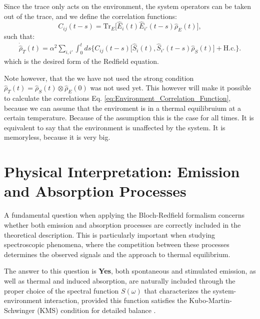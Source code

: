 Since the trace only acts on the environment, the system operators can be taken out of the trace, and we define the correlation functions:
\begin{equation}
    C_{ij}(t - s) = \mathrm{Tr}_E \big[\hat{E}_{i}(t) \hat{E}_{i'}(t-s) \hat{\rho}_E(t)\big],
    \label{eq:Environment_Correlation_Function}
\end{equation}
such that:
\begin{align}
    \dot{\hat{\rho}}_T(t) = \alpha^2  \sum_{i, i'} \int_0^t ds
    \bigg\{
    C_{ij}(t - s) \big[ \hat{S}_i(t),  \hat{S}_{i'}(t-s) \hat{\rho}_S(t) \big] + \text{H.c.}
    \bigg\}.
    \label{eq:Redfield_Equation_Final}
\end{align}
which is the desired form of the Redfield equation.

Note however, that the we have not used the strong condition $\hat{\rho}_T(t) = \hat{\rho}_S(t) \otimes \hat{\rho}_E(0)$ was not used yet.
This however will make it possible to calculate the correlations Eq. \eqref{eq:Environment_Correlation_Function}, because we can assume that the enviroment is in a thermal equilibruium at a certain temperature.
Because of the assumption this is the case for all times.
It is equivalent to say that the environment is unaffected by the system. It is memoryless, because it is very big.


\section{Physical Interpretation: Emission and Absorption Processes}
\label{sec:emission_absorption_kms}

\noindent A fundamental question when applying the Bloch-Redfield formalism concerns whether both emission and absorption processes are correctly included in the theoretical description. This is particularly important when studying spectroscopic phenomena, where the competition between these processes determines the observed signals and the approach to thermal equilibrium.

\noindent The answer to this question is \textbf{Yes}, both spontaneous and stimulated emission, as well as thermal and induced absorption, are naturally included through the proper choice of the spectral function $S(\omega)$ that characterizes the system-environment interaction, provided this function satisfies the Kubo-Martin-Schwinger (KMS) condition for detailed balance \cite{martinschwinger1959theorymanyparticlesystems, sewell2020quantummechanicsits}.

